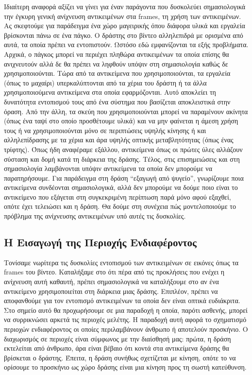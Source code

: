 \documentclass[11pt,a4paper,english,greek,twoside]{../Thesis}
\begin{document}
\par Ιδιαίτερη αναφορά αξίζει να γίνει για έναν παράγοντα που δυσκολεύει σημασιολογικά την έγκυρη γενική ανίχνευση αντικειμένων στα frames, τη χρήση των αντικειμένων. Ας σκεφτούμε για παράδειγμα ένα χώρο μαγειρικής όπου διάφορα υλικά και εργαλεία βρίσκονται πάνω σε ένα πάγκο. Ο δράστης στο βίντεο αλληλεπιδρά με ορισμένα από αυτά, τα οποία πρέπει να εντοπιστούν. Ωστόσο εδώ εμφανίζονται τα εξής προβλήματα. Αρχικά, ο πάγκος μπορεί να περιέχει πληθώρα αντικειμένων τα οποία επίσης θα ανιχνευτούν αλλά δε θα πρέπει να ληφθούν υπόψιν στη σημασιολογία καθώς δε χρησιμοποιούνται. Τώρα από τα αντικείμενα που χρησιμοποιούνται, τα εργαλεία (όπως το μαχαίρι) υπερκαλύπτονται από τα χέρια του δράστη ή τα άλλα χρησιμοποιούμενα αντικείμενα στα οποία εφαρμόζονται. Αυτό αποκλείει τη δυνατότητα εντοπισμού τους από ένα σύστημα που βασίζεται αποκλειστικά στην όραση. Από την άλλη, τα σκεύη που χρησιμοποιούνται μπορεί να παραμένουν ακίνητα (όπως ένα ταψί στο οποίο προσθέτουμε υλικά) και να μην φαίνεται η άμεση χρήση τους ή να χρησιμοποιούνται μόνο σε περιπτώσεις υψηλής κίνησης ή και αλληλεπίδρασης με τα χέρια και άρα υψηλής οπτικής μεταβλητότητας (όπως ένας τρίφτης). Όπως ήδη αναφέραμε εξάλλου, αντικείμενα όπως οι πρώτες ύλες αλλάζουν σύσταση και δομή κατά τη διάρκεια της δράσης. Τέλος, στις επισημειώσεις και στη σημασιολογία λαμβάνονται υπόψιν αντικείμενα τα οποία δεν μπορούμε να παρατηρήσουμε. Για παράδειγμα στη δράση “εξαγωγή από ψυγείο”, γνωρίζουμε ποια αντικείμενα συνδέονται σημασιολογικά, αλλά δεν μπορούμε να δούμε ποιο είναι το αντικείμενο που εξάγεται στη συγκεκριμένη περίπτωση παρά μόνο αφού εξαχθεί, οπότε έχει τελειώσει και η δράση. Θα δούμε στη συνέχεια πώς μοντελοποιούμε το πρόβλημα της ανίχνευσης αντικειμένων υπό αυτές τις δυσκολίες.


\subsection{Η Εισαγωγή της Περιοχής Ενδιαφέροντος}
Τονίσαμε νωρίτερα τις δυσκολίες εντοπισμού των αντικειμένων σε εικόνες όπως τα frames του βίντεο. Καταλήξαμε στο ότι πέρα από τις προκλήσεις που ενέχει η ανίχνευση αυτή καθαυτή, πρέπει σημασιολογικά να καταλήξουμε στο αν ένα αντικείμενο χρησιμοποιείται στη διάρκεια μιας δράσης. Επιπλέον, πρέπει να αποφανθούμε για τον εντοπισμό αντικειμένων τα οποία δεν είναι οπτικά ευδιάκριτα. Στο σημείο αυτό θα προχωρήσουμε σε μια παραδοχή η οποία, παρότι ασθενής, μπορεί να συρρικνώσει αρκετά τις περιοχές μελέτης. Η παραδοχή αυτή αφορά το σχηματισμό περιοχών ενδιαφέροντος οι οποίες περιλαμβάνουν άνθρωπο ή αποτελούν προσκήνιο. Ο διαχωρισμός σε περιοχές είναι σύμφωνος με την διαίσθησή μας: πρώτα, η δράση εκτελείται από άνθρωπο, άρα είναι  βέβαιο ότι κοντά στα αντικείμενα δράσης θα βρίσκεται ο δράστης. Έπειτα, η δράση συνήθως σχετίζεται με κίνηση, οπότε το να ορίσουμε το προσκήνιο ως χώρο δράσης είναι μια κίνηση προς τη σωστή κατεύθυνση.
\end{document}
